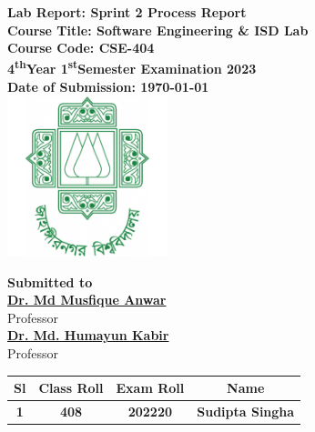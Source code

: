 \documentclass[a4paper,12pt]{article}
\begin{document}
\begin{center}
    \textbf{\large{Lab Report: Sprint 2 Process Report}}\\
    \vspace{0.2cm}
    \textbf{Course Title: Software Engineering \& ISD Lab}\\
    \vspace{0.2cm}
    \textbf{Course Code: CSE-404}\\
    \vspace{0.2cm}
    \textbf{4\textsuperscript{th}Year 1\textsuperscript{st}Semester Examination 2023}\\
    \vspace{0.5cm}
    \textbf{Date of Submission: \today}\\

    \vspace{1.5cm}
    \includegraphics[width=0.35\textwidth]{images/logo.png}\\ %
    \vspace{1cm}

    \textbf{Submitted to}\\
    \vspace{0.2cm}
    \textbf{\href{https://juniv.edu/teachers/musfique.anwar}{Dr. Md Musfique Anwar}}\\
    {Professor}\\
    \vspace{0.2cm}
    \textbf{\href{https://juniv.edu/teachers/hkabir}{Dr. Md. Humayun Kabir}}\\
    {Professor}\\


    \vspace{1cm}

    \begin{table}[h!]
        \centering
        \begin{tabular}{|c|c|c|c|}
            \hline
            \rowcolor[HTML]{2F4F4F} %
            {\color[HTML]{FFFFFF}\textbf{Sl}}& {\color[HTML]{FFFFFF}\textbf{Class Roll}}& {\color[HTML]{FFFFFF}\textbf{Exam Roll}}& {\color[HTML]{FFFFFF}\textbf{Name}}\\ \hline
            \rowcolor[HTML]{B0E0E6}
            \textbf{1}& \textbf{408} & \textbf{202220} & \textbf{Sudipta Singha} \\ \hline
       

\end{tabular}
\end{table}
\end{center}
\end{document}
